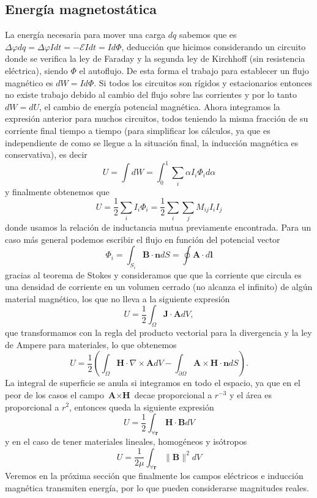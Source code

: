 \documentclass[11pt,a4paper]{article}
\numberwithin{equation}{section}
\begin{document}
\subsection{Energía magnetostática}
La energía necesaria para mover una carga $dq$ sabemos que es $\Delta \varphi dq = \Delta \varphi I dt = - \mathcal{E} I dt = I d\Phi$, deducción que hicimos considerando un circuito donde se verifica la ley de Faraday y la segunda ley de Kirchhoff (sin resistencia eléctrica), siendo $\Phi$ el autoflujo. De esta forma el trabajo para establecer un flujo magnético es $dW = I d\Phi$. Si todos los circuitos son rígidos y estacionarios entonces no existe trabajo debido al cambio del flujo sobre las corrientes y por lo tanto $dW = dU$, el cambio de energía potencial magnética. Ahora integramos la expresión anterior para muchos circuitos, todos teniendo la misma fracción de su corriente final tiempo a tiempo (para simplificar los cálculos, ya que es independiente de como se llegue a la situación final, la inducción magnética es conservativa), es decir
\[U = \int dW = \int_0^1 \sum_i \alpha I_i \Phi_i d\alpha\] y finalmente obtenemos que 
\begin{equation}
    U = \frac{1}{2} \sum_i I_i \Phi_i = \frac{1}{2} \sum_i \sum_j M_{ij} I_i I_j
    \label{eq:m_energia_circuitos}
\end{equation}
donde usamos la relación de inductancia mutua previamente encontrada.
Para un caso más general podemos escribir el flujo en función del potencial vector \[\Phi_i = \int_{S_i} \textbf{B} \cdot \textbf{n} dS = \oint \textbf{A} \cdot d\textbf{l}\] gracias al teorema de Stokes y consideramos que que la corriente que circula es una densidad de corriente en un volumen cerrado (no alcanza el infinito) de algún material magnético, los que no lleva a la siguiente expresión \[U = \frac{1}{2} \int_{\Omega} \textbf{J} \cdot \textbf{A} dV,\] que transformamos con la regla del producto vectorial para la divergencia y la ley de Ampere para materiales, lo que obtenemos \[U = \frac{1}{2} \left(\int_{\Omega} \textbf{H} \cdot \nabla \times \textbf{A} dV - \int_{\partial \Omega} \textbf{A} \times \textbf{H} \cdot \textbf{n} dS\right).\] La integral de superficie se anula si integramos en todo el espacio, ya que en el peor de los casos el campo $\textbf{A} \times \textbf{H}$ decae proporcional a $r^{-3}$ y el área es proporcional a $r^2$, entonces queda la siguiente expresión
\begin{equation}
    U = \frac{1}{2} \int_{\forall \textbf{r}} \textbf{H} \cdot \textbf{B} dV
    \label{eq:m_energia_campo}
\end{equation}
y en el caso de tener materiales lineales, homogéneos y isótropos
\begin{equation}
    U = \frac{1}{2\mu} \int_{\forall \textbf{r}} \|\textbf{B}\|^2 dV
\end{equation}
Veremos en la próxima sección que finalmente los campos eléctricos e inducción magnética transmiten energía, por lo que pueden considerarse magnitudes reales.
\end{document}
